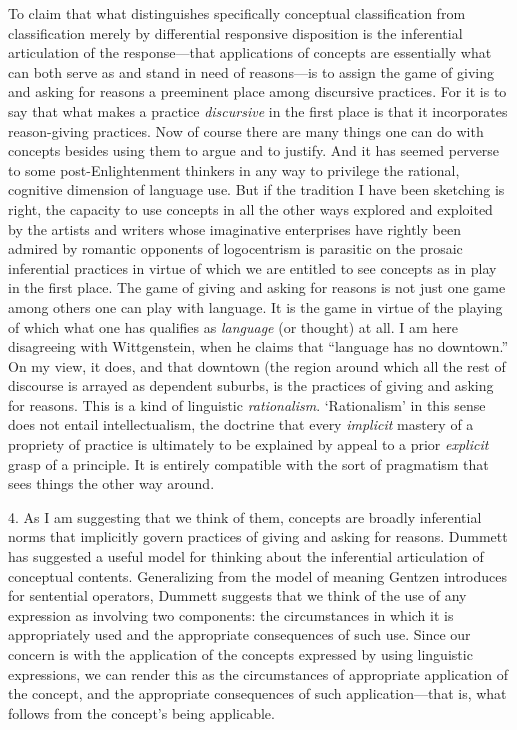 To claim that what distinguishes specifically conceptual classification
from classification merely by differential responsive disposition is the
inferential articulation of the response---that applications of concepts
are essentially what can both serve as and stand in need of reasons---is
to assign the game of giving and asking for reasons a preeminent place
among discursive practices. For it is to say that what makes a practice
\emph{discursive} in the first place is that it incorporates
reason-giving practices. Now of course there are many things one can do
with concepts besides using them to argue and to justify. And it has
seemed perverse to some post-Enlightenment thinkers in any way to
privilege the rational, cognitive dimension of language use. But if the
tradition I have been sketching is right, the capacity to use concepts
in all the other ways explored and exploited by the artists and writers
whose imaginative enterprises have rightly been admired by romantic
opponents of logocentrism is parasitic on the prosaic inferential
practices in virtue of which we are entitled to see concepts as in play
in the first place. The game of giving and asking for reasons is not
just one game among others one can play with language. It is the game in
virtue of the playing of which what one has qualifies as \emph{language}
(or thought) at all. I am here disagreeing with Wittgenstein, when he
claims that ``language has no downtown.'' On my view, it does, and that
downtown (the region around which all the rest of discourse is arrayed
as dependent suburbs, is the practices of giving and asking for reasons.
This is a kind of linguistic \emph{rationalism}. `Rationalism' in this
sense does not entail intellectualism, the doctrine that every
\emph{implicit} mastery of a propriety of practice is ultimately to be
explained by appeal to a prior \emph{explicit} grasp of a principle. It
is entirely compatible with the sort of pragmatism that sees things the
other way around.

4. As I am suggesting that we think of them, concepts are broadly
inferential norms that implicitly govern practices of giving and asking
for reasons. Dummett has suggested a useful model for thinking about the
inferential articulation of conceptual contents. Generalizing from the
model of meaning Gentzen introduces for sentential operators, Dummett
suggests that we think of the use of any expression as involving two
components: the circumstances in which it is appropriately used and the
appropriate consequences of such use. Since our concern is with the
application of the concepts expressed by using linguistic expressions,
we can render this as the circumstances of appropriate application of
the concept, and the appropriate consequences of such application---that
is, what follows from the concept's being applicable.

